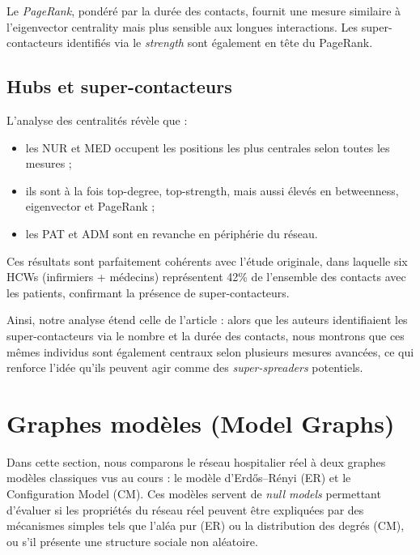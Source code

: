 \documentclass[10pt,twocolumn]{article}
\begin{document}
Le \textit{PageRank}, pondéré par la durée des contacts, fournit une mesure similaire à l'eigenvector centrality mais plus sensible aux longues interactions.
Les super-contacteurs identifiés via le \textit{strength} sont également en tête du PageRank.

\subsection{Hubs et super-contacteurs}

L'analyse des centralités révèle que :
\begin{itemize}
    \item les NUR et MED occupent les positions les plus centrales selon toutes les mesures ;
    \item ils sont à la fois top-degree, top-strength, mais aussi élevés en betweenness, eigenvector et PageRank ;
    \item les PAT et ADM sont en revanche en périphérie du réseau.
\end{itemize}

Ces résultats sont parfaitement cohérents avec l'étude originale, dans laquelle six HCWs (infirmiers + médecins) représentent 42\% de l'ensemble des contacts avec les patients, confirmant la présence de super-contacteurs.

Ainsi, notre analyse étend celle de l'article : alors que les auteurs identifiaient les super-contacteurs via le nombre et la durée des contacts, nous montrons que ces mêmes individus sont également centraux selon plusieurs mesures avancées, ce qui renforce l'idée qu'ils peuvent agir comme des \textit{super-spreaders} potentiels.

\section{Graphes modèles (Model Graphs)}

Dans cette section, nous comparons le réseau hospitalier réel à deux graphes modèles classiques vus au cours : le modèle d'Erdős–Rényi (ER) et le Configuration Model (CM). 
Ces modèles servent de \textit{null models} permettant d'évaluer si les propriétés du réseau réel peuvent être expliquées par des mécanismes simples tels que l'aléa pur (ER) ou la distribution des degrés (CM), ou s'il présente une structure sociale non aléatoire.
\end{document}

